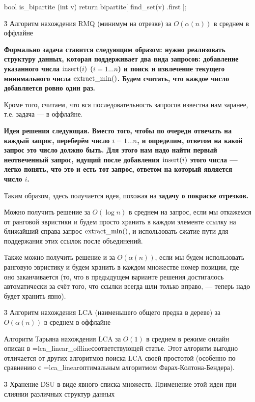 bool is_bipartite (int v) {
	return bipartite[ find_set(v) .first ];
}
\endcode



\h3{ Алгоритм нахождения RMQ (минимум на отрезке) за $O(\alpha(n))$ в среднем в оффлайне }

\bf{Формально} задача ставится следующим образом: нужно реализовать структуру данных, которая поддерживает два вида запросов: добавление указанного числа ${\rm insert}(i)$ ($i = 1 \ldots n$) и поиск и извлечение текущего минимального числа ${\rm extract\_min}()$. Будем считать, что каждое число добавляется ровно один раз.

Кроме того, считаем, что вся последовательность запросов известна нам заранее, т.е. задача --- в оффлайне.

\bf{Идея решения} следующая. Вместо того, чтобы по очереди отвечать на каждый запрос, переберём число $i = 1 \ldots n$, и определим, ответом на какой запрос это число должно быть. Для этого нам надо найти первый неотвеченный запрос, идущий после  добавления ${\rm insert}(i)$ этого числа --- легко понять, что это и есть тот запрос, ответом на который является число $i$.

Таким образом, здесь получается идея, похожая на \bf{задачу о покраске отрезков}.

Можно получить решение за $O(\log n)$ в среднем на запрос, если мы откажемся от ранговой эвристики и будем просто хранить в каждом элементе ссылку на ближайший справа запрос ${\rm extract\_min}()$, и использовать сжатие пути для поддержания этих ссылок после объединений.

Также можно получить решение и за $O(\alpha(n))$, если мы будем использовать ранговую эвристику и будем хранить в каждом множестве номер позиции, где оно заканчивается (то, что в предыдущем варианте решения достигалось автоматически за счёт того, что ссылки всегда шли только вправо, --- теперь надо будет хранить явно).



\h3{ Алгоритм нахождения LCA (наименьшего общего предка в дереве) за $O(\alpha(n))$ в среднем в оффлайне }

Алгоритм Тарьяна нахождения LCA за $O(1)$ в среднем в режиме онлайн описан в \algohref=lca_linear_offline{соответствующей статье}. Этот алгоритм выгодно отличается от других алгоритмов поиска LCA своей простотой (особенно по сравнению с \algohref=lca_linear{оптимальным алгоритмом Фарах-Колтона-Бендера}).



\h3{ Хранение DSU в виде явного списка множеств. Применение этой идеи при слиянии различных структур данных }

